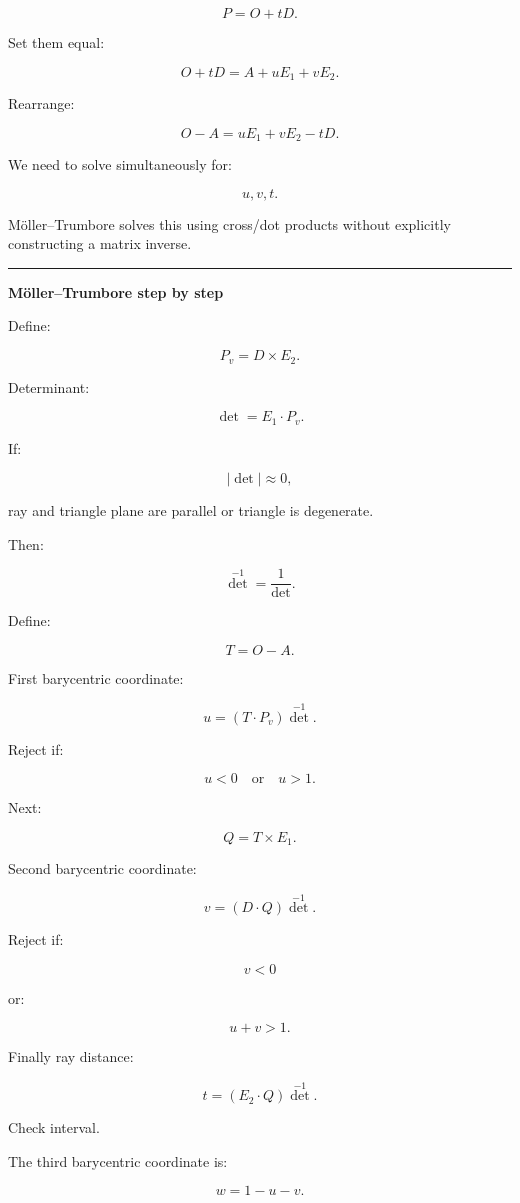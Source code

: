 \[
P=O+tD.
\]

Set them equal:

\[
O+tD
=
A+uE_1+vE_2.
\]

Rearrange:

\[
O-A
=
uE_1+vE_2-tD.
\]

We need to solve simultaneously for:

\[
u,v,t.
\]

Möller--Trumbore solves this using cross/dot products without explicitly constructing a matrix inverse.

\begin{center}\rule{0.5\linewidth}{0.5pt}\end{center}

\textbf{Möller--Trumbore step by step}

Define:

\[
P_v=D\times E_2.
\]

Determinant:

\[
\boxed{
\det=
E_1\cdot P_v.
}
\]

If:

\[
|\det|\approx0,
\]

ray and triangle plane are parallel or triangle is degenerate.

Then:

\[
\det^{-1}=\frac1{\det}.
\]

Define:

\[
T=O-A.
\]

First barycentric coordinate:

\[
\boxed{
u=
(T\cdot P_v)\det^{-1}.
}
\]

Reject if:

\[
u<0
\quad\text{or}\quad
u>1.
\]

Next:

\[
Q=T\times E_1.
\]

Second barycentric coordinate:

\[
\boxed{
v=
(D\cdot Q)\det^{-1}.
}
\]

Reject if:

\[
v<0
\]

or:

\[
u+v>1.
\]

Finally ray distance:

\[
\boxed{
t=
(E_2\cdot Q)\det^{-1}.
}
\]

Check interval.

The third barycentric coordinate is:

\[
\boxed{
w=1-u-v.
}
\]

